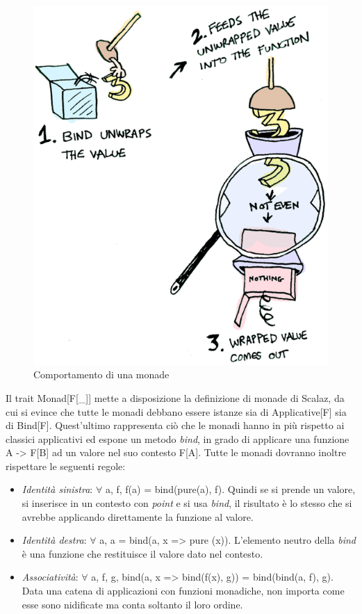 \begin{figure}[th]
\centering
\includegraphics[scale=0.48]{images/monad}
\decoRule
\caption[monad]{Comportamento di una monade \cite{FunctorsApplicativesMonads}}
\end{figure}

Il trait Monad[F[\_]] mette a disposizione la definizione di monade di Scalaz, da cui si evince che tutte le monadi debbano essere istanze sia di Applicative[F] sia di Bind[F]. Quest'ultimo rappresenta ciò che le monadi hanno in più rispetto ai classici applicativi ed espone un metodo \textit{bind}, in grado di applicare una funzione A -> F[B] ad un valore nel suo contesto F[A]. Tutte le monadi dovranno inoltre rispettare le seguenti regole:

\begin{itemize}
\item \textit{Identità sinistra}: $\forall$ a, f, f(a) = bind(pure(a), f). Quindi se si prende un valore, si inserisce in un contesto con \textit{point} e si usa \textit{bind}, il risultato è lo stesso che si avrebbe applicando direttamente la funzione al valore.
\item \textit{Identità destra}: $\forall$ a, a = bind(a, x => pure (x)). L'elemento neutro della \textit{bind} è una funzione che restituisce il valore dato nel contesto.
\item \textit{Associatività}: $\forall$ a, f, g, bind(a, x => bind(f(x), g)) = bind(bind(a, f), g). Data una catena di applicazioni con funzioni monadiche, non importa come esse sono nidificate ma conta soltanto il loro ordine.
\end{itemize}

